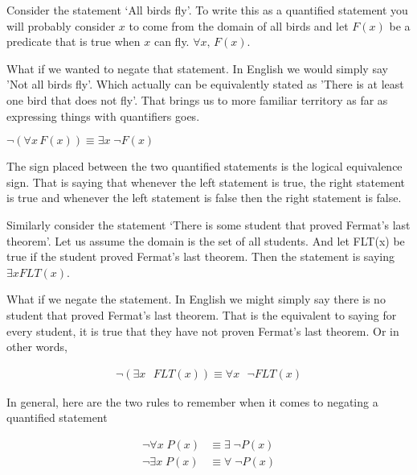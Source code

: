 \documentclass[12pt]{article}
\begin{document}
Consider the statement `All birds fly'. To write this as a quantified statement you will probably consider $x$ to come from the domain of all birds and let $F(x)$ be a predicate that is true when $x$ can fly. $\forall x, \, F(x)$. 

What if we wanted to negate that statement. In English we would simply say 'Not all birds fly'. Which actually can be equivalently stated as 'There is at least one bird that does not fly'. That brings us to more familiar territory as far as expressing things with quantifiers goes. 

$\neg (\forall x \, F(x)) \equiv \exists x \; \neg F(x)$

The sign placed between the two quantified statements is the logical equivalence sign. That is saying that whenever the left statement is true, the right statement is true and whenever the left statement is false then the right statement is false. 

Similarly consider the statement `There is some student that proved Fermat's last theorem'. Let us assume the domain is the set of all students. And let FLT(x) be true if the student proved Fermat's last theorem. Then the statement is saying $\exists x FLT(x)$. 

What if we negate the statement. In English we might simply say there is no student that proved Fermat's last theorem. That is the equivalent to saying for every student, it is true that they have not proven Fermat's last theorem. Or in other words, 

\begin{align*}
\neg (\exists x \text{ } FLT(x)) \equiv \forall x \text{ } \neg FLT(x)
\end{align*}


In general, here are the two rules to remember when it comes to negating a quantified statement

\begin{align*}
\neg \forall x \; P(x) &\equiv \exists \; \neg P(x) \\
\neg \exists x \; P(x) &\equiv \forall \; \neg P(x)
\end{align*}
\end{document}

